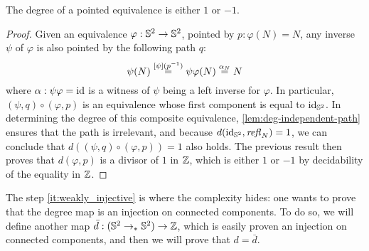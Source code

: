 \documentclass[english,a4]{article}
\renewcommand{\ap}[1]{\left[{#1}\right]}
\newcommand{\ptdto}{\to_\ast}%
\begin{document}
\begin{corollary}
  The degree of a pointed equivalence is either $1$ or $-1$.
  \label{cor:degree-equivalences}
\end{corollary}
\begin{proof}
  Given an equivalence $\varphi:{{\mathbb S^{2}}} \to {{\mathbb S^{2}}}$, pointed by $p:\varphi(N) = N$,
  any inverse $\psi$ of $\varphi$ is also pointed by the following path $q$:
  \begin{displaymath}
    \psi(N) \overset {\ap\psi(\inv p)} = \psi\varphi(N) \overset {\alpha_N}  = N
  \end{displaymath}
  where $\alpha: \psi\varphi = \mathord{\mathrm{id}}$ is a witness of $\psi$ being a left inverse
  for $\varphi$. In particular, $(\psi, q) \circ (\varphi, p)$ is an
  equivalence whose first component is equal to $\mathord{\mathrm{id}}_{{\mathbb S^{2}}}$. In determining the
  degree of this composite equivalence, \cref{lem:deg-independent-path} ensures
  that the path is irrelevant, and because $d(\mathord{\mathrm{id}}_{{\mathbb S^{2}}}, \mathop{{\mathit{refl}}_{N}}) = 1$, we can
  conclude that $d((\psi, q) \circ (\varphi, p)) = 1$ also holds. The previous
  result then proves that $d(\varphi, p)$ is a divisor of $1$ in $\mathbb{Z}$, which
  is either $1$ or $-1$ by decidability of the equality in $\mathbb{Z}$.
\end{proof}

The step \ref{it:weakly_injective} 
is where the complexity hides: one wants to prove that the degree
map is an injection on connected components. To do so, we will define
another map $\bar d: (\Sp \ptdto \Sp) \to \ZZ$, which is easily proven an
injection on connected components, and then we will prove that $d = \bar d$.
\end{document}
